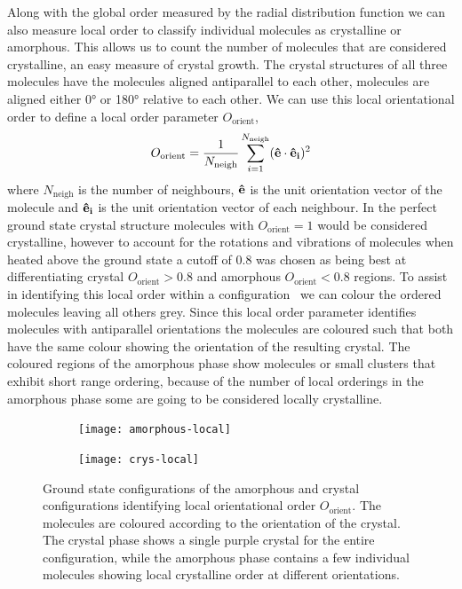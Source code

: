 Along with the global order measured by the radial distribution function we can also measure local order to classify individual molecules as crystalline or amorphous. This allows us to count the number of molecules that are considered crystalline, an easy measure of crystal growth. The crystal structures of all three molecules have the molecules aligned antiparallel to each other, molecules are aligned either \ang{0} or \ang{180} relative to each other. We can use this local orientational order to define a local order parameter $O_\text{orient}$,
\begin{equation}
    O_{\text{orient}} = \frac{1}{N_{\text{neigh}}}\sum_{i=1}^{N_\text{neigh}} (\mathbf{\hat e} \cdot \mathbf{\hat e_i})^2
\end{equation}
where $N_\text{neigh}$ is the number of neighbours, $\mathbf{\hat e}$ is the unit orientation vector of the molecule and $\mathbf{\hat e_i}$ is the unit orientation vector of each neighbour. In the perfect ground state crystal structure molecules with $O_\text{orient}=1$ would be considered crystalline, however to account for the rotations and vibrations of molecules when heated above the ground state a cutoff of \num{0.8} was chosen as being best at differentiating crystal $O_\text{orient}> 0.8$ and amorphous $O_\text{orient} < 0.8$ regions. To assist in identifying this local order within a configuration~ we can colour the ordered molecules leaving all others grey. Since this local order parameter identifies molecules with antiparallel orientations the molecules are coloured such that both have the same colour showing the orientation of the resulting crystal. The coloured regions of the amorphous phase show molecules or small clusters that exhibit short range ordering, because of the number of local orderings in the amorphous phase some are going to be considered locally crystalline.

\begin{figure}
    \begin{subfigure}{0.5\textwidth}
        \texttt{[image: amorphous-local]}
        \caption{}
        \label{fig:amorphous local}
    \end{subfigure}
    \begin{subfigure}{0.5\textwidth}
        \texttt{[image: crys-local]}
        \caption{}
        \label{fig:crys local}
    \end{subfigure}
    \caption{Ground state configurations of the amorphous  and crystal  configurations identifying local orientational order $O_\text{orient}$. The molecules are coloured according to the orientation of the crystal. The crystal phase shows a single purple crystal for the entire configuration, while the amorphous phase contains a few individual molecules showing local crystalline order at different orientations.}
    \label{fig:orient comp}
\end{figure}

